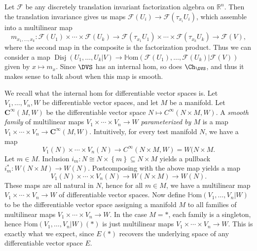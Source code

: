 Let $\mathcal{F} $ be any discretely translation invariant factorization algebra on $\mathbb{R} ^n$. Then the translation invariance gives us maps $\mathcal{F} (U_i) \to \mathcal{F} (\tau_{x_i} U_i)$, which assemble into a multilinear map
\[
	m_{x_1, \ldots , x_k} : \mathcal{F} (U_1)\times \cdots \times \mathcal{F} (U_k) \to \mathcal{F} (\tau _{x_1} U_1)\times \cdots \times \mathcal{F} (\tau _{x_k} U_k) \to \mathcal{F} (V),
\]
where the second map in the composite is the factorization product. Thus we can consider a map $\operatorname{Disj} (U_1, \ldots , U_k | V) \to \mathbb{H} \mathrm{om}(\mathcal{F} (U_1), \ldots , \mathcal{F} (U_k) | \mathcal{F} (V)) $ given by $x\mapsto m_x$. Since $\DVS $ has an internal hom, so does $\Ch_{\DVS } $, and thus it makes sense to talk about when this map is smooth.

\begin{remark}\label{rmk:dvs-hom}
	We recall what the internal hom for differentiable vector spaces is. Let $V_1, \ldots , V_n,W$ be differentiable vector spaces, and let $M$ be a manifold. Let $\mathbf{C}^{\infty }(M,W)$ be the differentiable vector space $N\mapsto C^\infty(N\times M,W) $. A \emph{smooth family} of multilinear maps $V_1\times \cdots \times V_n \to W$ \emph{parameterized by $M$} is a map $V_1 \times \cdots \times V_n \to \mathbf{C}^{\infty } (M,W)$. Intuitively, for every test manifold $N$, we have a map
	\[
		V_1(N)\times \cdots \times V_n(N) \to C^\infty (N\times M,W) = W(N\times M
	.\]
	Let $m\in M$. Inclusion $i_m : N \cong N\times \left\{ m \right\} \subseteq N\times M$ yields a pullback $i_m^* : W(N\times M) \to W(N)$. Postcomposing with the above map yields a map
	\[
		V_1(N)\times \cdots \times V_n(N)\to W(N\times M) \to W(N)
	.\]
	These maps are all natural in $N$, hence for all $m\in M$, we have a multilinear map $V_1\times \cdots \times V_n \to W$ of differentiable vector spaces. Now define $\mathbb{H} \mathrm{om} (V_1, \ldots , V_n | W)$ to be the differentiable vector space assigning a manifold $M$ to all families of multilinear maps $V_1\times \cdots \times V_n \to W$. In the case $M=*$, each family is a singleton, hence $\mathbb{H} \mathrm{om} (V_1, \ldots , V_n | W)(*)$ is just multilinear maps $V_1\times \cdots \times V_n \to W$. This is exactly what we expect, since $E(*)$ recovers the underlying space of any differentiable vector space $E$.
\end{remark}


